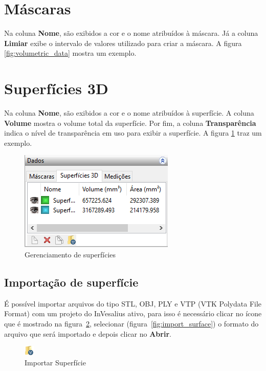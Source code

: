 \newpage


\section{Máscaras}

Na coluna \textbf{Nome}, são exibidos a cor e o nome atribuídos à máscara. Já a coluna
\textbf{Limiar} exibe o intervalo de valores utilizado para criar a máscara. A figura
\ref{fig:volumetric_data} mostra um exemplo.

\section{Superfícies 3D}

Na coluna \textbf{Nome}, são exibidos a cor e o nome atribuídos à superfície. A coluna 
\textbf{Volume} mostra o volume total da superfície. Por fim, a coluna \textbf{Transparência}
indica o nível de transparência em uso para exibir a superfície. A figura \ref{fig:surface_manager}
traz um exemplo.

\begin{figure}[!htb]
\centering
\includegraphics[scale=0.7]{../user_guide_figures/invesalius_screen/painel_volumetric_measures_pt.png}
\caption{Gerenciamento de superfícies}
\label{fig:surface_manager}
\end{figure}

\subsection{Importação de superfície}

É possível importar arquivos do tipo STL, OBJ, PLY e VTP (VTK Polydata File Format) com um projeto do InVesalius ativo, para isso é necessário clicar no ícone que é mostrado na figura~\ref{fig:import_stl}, selecionar (figura~\ref{fig:import_surface}) o formato do arquivo que será importado e depois clicar no \textbf{Abrir}.

\begin{figure}[!htb]
\centering
\includegraphics[scale=0.8]{../user_guide_figures/icons/load_mesh.png}
\caption{Importar Superfície}
\label{fig:import_stl}
\end{figure}

